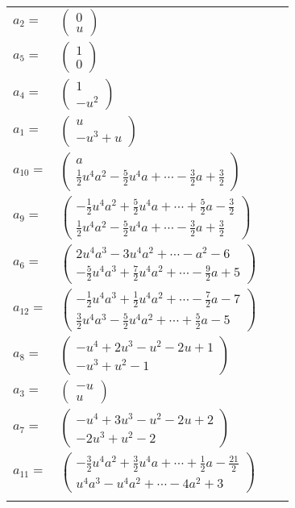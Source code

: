 \documentclass[1p]{elsarticle_modified}
\theoremstyle{definition}
\begin{document}
\begin{tabular}{m{7pt} m{180pt} m{7pt} m{180pt} }
\flushright $a_{2}=$&$\begin{pmatrix}0\\u\end{pmatrix}$ \\
\flushright $a_{5}=$&$\begin{pmatrix}1\\0\end{pmatrix}$ \\
\flushright $a_{4}=$&$\begin{pmatrix}1\\- u^2\end{pmatrix}$ \\
\flushright $a_{1}=$&$\begin{pmatrix}u\\- u^3+u\end{pmatrix}$ \\
\flushright $a_{10}=$&$\begin{pmatrix}a\\\frac{1}{2} u^4 a^2-\frac{5}{2} u^4 a+\cdots-\frac{3}{2} a+\frac{3}{2}\end{pmatrix}$ \\
\flushright $a_{9}=$&$\begin{pmatrix}-\frac{1}{2} u^4 a^2+\frac{5}{2} u^4 a+\cdots+\frac{5}{2} a-\frac{3}{2}\\\frac{1}{2} u^4 a^2-\frac{5}{2} u^4 a+\cdots-\frac{3}{2} a+\frac{3}{2}\end{pmatrix}$ \\
\flushright $a_{6}=$&$\begin{pmatrix}2 u^4 a^3-3 u^4 a^2+\cdots- a^2-6\\-\frac{5}{2} u^4 a^3+\frac{7}{2} u^4 a^2+\cdots-\frac{9}{2} a+5\end{pmatrix}$ \\
\flushright $a_{12}=$&$\begin{pmatrix}-\frac{1}{2} u^4 a^3+\frac{1}{2} u^4 a^2+\cdots-\frac{7}{2} a-7\\\frac{3}{2} u^4 a^3-\frac{5}{2} u^4 a^2+\cdots+\frac{5}{2} a-5\end{pmatrix}$ \\
\flushright $a_{8}=$&$\begin{pmatrix}- u^4+2 u^3- u^2-2 u+1\\- u^3+u^2-1\end{pmatrix}$ \\
\flushright $a_{3}=$&$\begin{pmatrix}- u\\u\end{pmatrix}$ \\
\flushright $a_{7}=$&$\begin{pmatrix}- u^4+3 u^3- u^2-2 u+2\\-2 u^3+u^2-2\end{pmatrix}$ \\
\flushright $a_{11}=$&$\begin{pmatrix}-\frac{3}{2} u^4 a^2+\frac{3}{2} u^4 a+\cdots+\frac{1}{2} a-\frac{21}{2}\\u^4 a^3- u^4 a^2+\cdots-4 a^2+3\end{pmatrix}$\\&\end{tabular}
\end{document}
